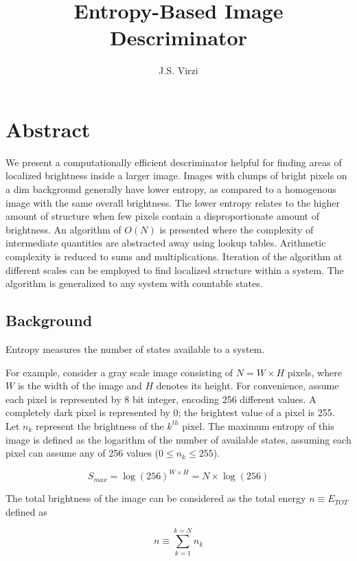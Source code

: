 \documentclass[11pt]{article} %
\title{Entropy-Based Image Descriminator}
\author{J.S. Virzi}
\begin{document}
\maketitle

\section{Abstract}

We present a computationally efficient descriminator helpful for finding areas of localized brightness inside a larger image.
Images with clumps of bright pixels on a dim background generally have lower entropy,
as compared to a homogenous image with the same overall brightness.
The lower entropy relates to the higher amount of structure when few pixels contain a disproportionate amount of brightness.
An algorithm of $O \left( N \right)$ is presented where the complexity of intermediate quantities are abstracted away using lookup tables.
Arithmetic complexity is reduced to sums and multiplications.
Iteration of the algorithm at different scales can be employed to find localized structure within a system.
The algorithm is generalized to any system with countable states.

\subsection{Background}

Entropy measures the number of states available to a system. 

For example, consider a gray scale image consisting of ${N = W \times H}$ pixels, where $W$ is the width of the image and $H$ denotes its height. For convenience, assume each pixel is represented by 8 bit integer, encoding 256 different values. 
A completely dark pixel is represented by 0; the brightest value of a pixel is 255.
Let $n_{k}$ represent the brightness of the $k^{th}$ pixel.
The maximum entropy of this image is defined as the logarithm of the number of available states,
assuming each pixel can assume any of 256 values ($0 \le n_{k} \le 255$).

\begin{equation}
S_{max} = \log \left( 256 \right)^{W \times H} = N \times \log \left( 256 \right)
\end{equation}

The total brightness of the image can be considered as the total energy $n \equiv E_{TOT}$ defined as

\begin{equation}
n \equiv \sum_{k=1}^{k=N} n_{k}
\end{equation}
\end{document}
